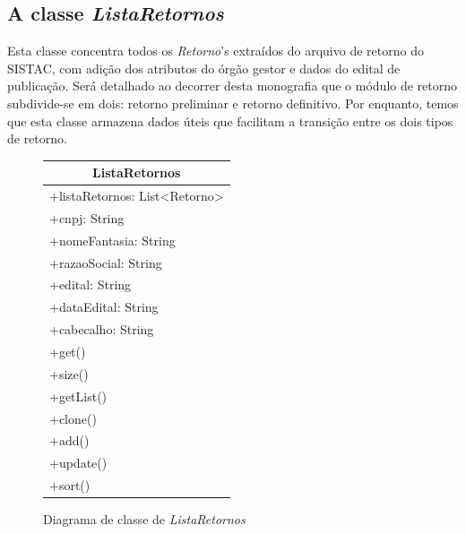 \documentclass[
	12pt,			%
	openright,		%
	oneside,	
	a4paper,		%
	english,		%
	brazil			%
]{abntex2/abntex2}  %
\begin{document}
	\subsection{A classe \textit{ListaRetornos}}

	Esta classe concentra todos os \textit{Retorno}'s extraídos do arquivo de retorno do SISTAC, com adição dos atributos do órgão gestor e dados do edital de publicação. Será detalhado ao decorrer desta monografia que o módulo de retorno subdivide-se em dois: retorno preliminar e retorno definitivo. Por enquanto, temos que esta classe armazena dados úteis que facilitam a transição entre os dois tipos de retorno.

	\begin{figure}[H]
		\begin{center}
			
			\caption{Diagrama de classe de \textit{ListaRetornos}}
			\label{listaretornos-uml}
			
			\begin{tabular}{|l|}
				\hline
				\multicolumn{1}{|c|}{\textbf{ListaRetornos}}         \\ \hline
				+listaRetornos: List\textless{}Retorno\textgreater{} \\
				+cnpj: String                                        \\
				+nomeFantasia: String                                \\
				+razaoSocial: String                                 \\
				+edital: String                                      \\
				+dataEdital: String                                  \\
				+cabecalho: String                                   \\ \hline
				+get()                                               \\
				+size()                                              \\
				+getList()                                           \\
				+clone()                                             \\
				+add()                                               \\
				+update()                                            \\
				+sort()                                              \\ \hline
			\end{tabular}
			
			
		\end{center}
	\end{figure}
	
\end{document}
